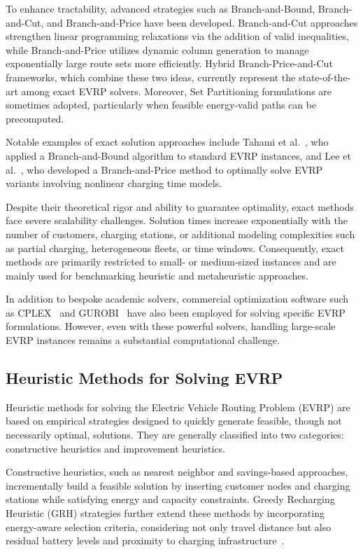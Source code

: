 To enhance tractability, advanced strategies such as Branch-and-Bound, Branch-and-Cut, and Branch-and-Price have been developed.  
Branch-and-Cut approaches strengthen linear programming relaxations via the addition of valid inequalities, while Branch-and-Price utilizes dynamic column generation to manage exponentially large route sets more efficiently.  
Hybrid Branch-Price-and-Cut frameworks, which combine these two ideas, currently represent the state-of-the-art among exact EVRP solvers.  
Moreover, Set Partitioning formulations are sometimes adopted, particularly when feasible energy-valid paths can be precomputed.

Notable examples of exact solution approaches include Tahami et al.~\cite{tahami2020exact}, who applied a Branch-and-Bound algorithm to standard EVRP instances, and Lee et al.~\cite{lee2021exact}, who developed a Branch-and-Price method to optimally solve EVRP variants involving nonlinear charging time models.

Despite their theoretical rigor and ability to guarantee optimality, exact methods face severe scalability challenges.  
Solution times increase exponentially with the number of customers, charging stations, or additional modeling complexities such as partial charging, heterogeneous fleets, or time windows.  
Consequently, exact methods are primarily restricted to small- or medium-sized instances and are mainly used for benchmarking heuristic and metaheuristic approaches.

In addition to bespoke academic solvers, commercial optimization software such as CPLEX~\cite{hulagu2019multiple,keskin2019electric} and GUROBI~\cite{moghaddam2015partially,schiffer2017electric} have also been employed for solving specific EVRP formulations.  
However, even with these powerful solvers, handling large-scale EVRP instances remains a substantial computational challenge.



\subsection{Heuristic Methods for Solving EVRP}

Heuristic methods for solving the Electric Vehicle Routing Problem (EVRP) are based on empirical strategies designed to quickly generate feasible, though not necessarily optimal, solutions.  
They are generally classified into two categories: constructive heuristics and improvement heuristics.

Constructive heuristics, such as nearest neighbor and savings-based approaches, incrementally build a feasible solution by inserting customer nodes and charging stations while satisfying energy and capacity constraints.  
Greedy Recharging Heuristic (GRH) strategies further extend these methods by incorporating energy-aware selection criteria, considering not only travel distance but also residual battery levels and proximity to charging infrastructure~\cite{felipe2014heuristic,schiffer2018adaptive,schneider2014electric}.

